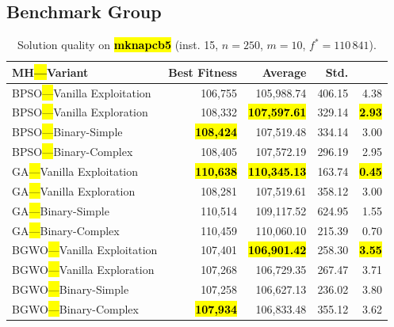 \documentclass[mathematics,article,accept,moreauthors]{Definitions/mdpi}
\begin{document}
\subsection{Benchmark Group }

\vspace{-9pt}

\begin{table}[H]
  \small
  \caption{Solution quality on \textbf{\hl{mknapcb5}} (inst. 15, $n=250$, $m=10$, $f^*=110\,841$).}
  \label{tab:calidad_mknapcb5_15}
  \begin{tabularx}{\textwidth}{lRRRR}
    \toprule
    \textbf{MH\hl{---}Variant} &
    \textbf{Best Fitness} &
    \textbf{Average} &
    \textbf{Std.} &
    \textbf{} \\
    \midrule
    BPSO\hl{---}Vanilla Exploitation &         106,755 &        105,988.74 & 406.15 &         4.38 \\
    BPSO\hl{---}Vanilla Exploration  &         108,332 & \textbf{\hl{107,597.61}} & 329.14 & \textbf{\hl{2.93}} \\
    BPSO\hl{---}Binary-Simple        & \textbf{\hl{108,424}} &        107,519.48 & 334.14 &         3.00 \\
    BPSO\hl{---}Binary-Complex       &         108,405 &        107,572.19 & 296.19 &         2.95 \\
    \midrule
    GA\hl{---}Vanilla Exploitation   & \textbf{\hl{110,638}} & \textbf{\hl{110,345.13}} & 163.74 & \textbf{\hl{0.45}} \\
    GA\hl{---}Vanilla Exploration    &         108,281 &        107,519.61 & 358.12 &         3.00 \\
    GA\hl{---}Binary-Simple          &         110,514 &        109,117.52 & 624.95 &         1.55 \\
    GA\hl{---}Binary-Complex         &         110,459 &        110,060.10 & 215.39 &         0.70 \\
    \midrule
    BGWO\hl{---}Vanilla Exploitation &         107,401 & \textbf{\hl{106,901.42}} & 258.30 & \textbf{\hl{3.55}} \\
    BGWO\hl{---}Vanilla Exploration  &         107,268 &        106,729.35 & 267.47 &         3.71 \\
    BGWO\hl{---}Binary-Simple        &         107,258 &        106,627.13 & 236.02 &         3.80 \\
    BGWO\hl{---}Binary-Complex       & \textbf{\hl{107,934}} &        106,833.48 & 355.12 &         3.62 \\

\end{tabularx}
\end{table}
\end{document}

